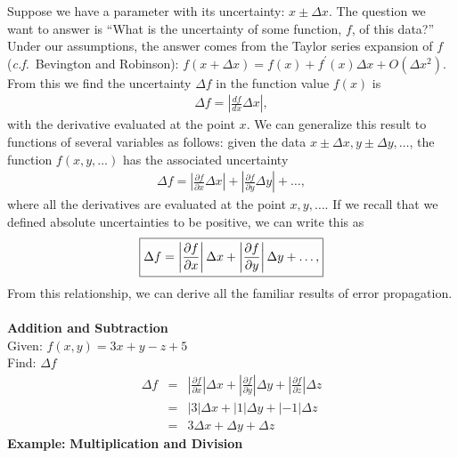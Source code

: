 Suppose we have a parameter with its uncertainty: $x \pm \Delta x$. The 
question we want to answer is ``What is the uncertainty of some function, $f$,
of this data?'' Under our assumptions, the answer comes from the Taylor 
series expansion of $f$ ({\it c.f.}~Bevington and Robinson): 
$f(x + \Delta x) = f(x) + f^\prime(x) \Delta x + O(\Delta x ^2)$. From this we 
find the uncertainty $\Delta f$ in the function value $f(x)$ is
\begin{eqnarray*}
\Delta f = \left| \frac{df}{dx} \Delta x \right|,
\end{eqnarray*}
with the derivative evaluated at the point $x$. We can generalize this result 
to functions of several variables as follows: given the data $x \pm \Delta x, 
y \pm \Delta y, \ldots$,  the function $f(x,y,\ldots)$ has the associated 
uncertainty
\begin{eqnarray*}
\Delta f = \left| \frac{\partial f}{\partial x} \Delta x \right| +
           \left| \frac{\partial f}{\partial y} \Delta y \right| + \ldots,
\end{eqnarray*}
where all the derivatives are evaluated at the point $x,y,\ldots$. If we recall
that we defined absolute uncertainties to be positive, we can write this as
\begin{equation}
 \fbox{$ \displaystyle \Delta f = \left| \frac{\partial f}{\partial x} \right| \Delta x +
           \left| \frac{\partial f}{\partial y} \right| \Delta y + \ldots, $}
\label{equ:diff:uncertainty}
\end{equation}
From  this relationship, we can derive all the familiar results of error 
propagation.\\
\\
  {\bf Addition and Subtraction} \\
Given: $f(x,y) = 3x+y-z+5$ \\
Find:  $\Delta f$ \\
\begin{eqnarray*}
\Delta  f & = & \left| \frac{\partial f}{\partial x} \right| \Delta x +
           \left| \frac{\partial f}{\partial y} \right| \Delta y +
            \left| \frac{\partial f}{\partial z} \right| \Delta z \\
 & = & \left|3 \right| \Delta x +  \left| 1  \right| \Delta y +\left|-1\right| \Delta z \\  
 & = & 3 \Delta x + \Delta y + \Delta z
\end{eqnarray*}
\noindent
{\bf Example:}  {\bf Multiplication and Division} \\
